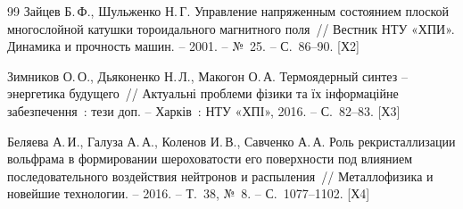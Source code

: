 \documentclass[11pt,a4paper]{article}
\begin{document}
\begin{thebibliography}{99}
 Зайцев Б.\,Ф., Шульженко Н.\,Г. Управление напряженным
  состоянием плоской многослойной катушки тороидального магнитного поля~// Вестник
  НТУ «ХПИ». Динамика и прочность машин. -- 2001. -- №~25. -- С.~86--90. [Х2]

 Зимников О.\,О., Дьяконенко Н.\,Л., Макогон О.\,А.
  Термоядерный синтез -- энергетика будущего~// Актуальні проблеми фізики та їх
  інформаційне забезпечення~: тези доп. -- Харків~: НТУ «ХПІ», 2016. -- С.~82--83. [Х3]

 Беляева А.\,И., Галуза А.\,А., Коленов И.\,В., Савченко А.\,А.
  Роль рекристаллизации вольфрама в формировании шероховатости его поверхности под
  влиянием последовательного воздействия нейтронов и распыления~// Металлофизика и
  новейшие технологии. -- 2016. -- Т.~38, №~8. -- С.~1077--1102. [Х4]

\end{thebibliography}
\end{document}
